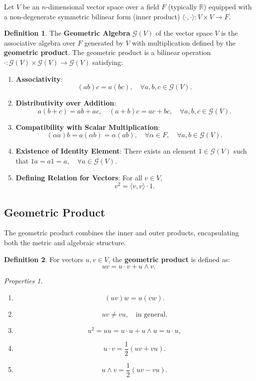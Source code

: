 \documentclass[a4paper,14pt]{article}
\theoremstyle{plain} %
\theoremstyle{definition} %
\theoremstyle{remark} %
\theoremstyle{definition}
\newtheorem{definition}{Definition}[section]
\theoremstyle{remark}
\newtheorem*{properties}{Properties}
\theoremstyle{remark}
\begin{document}
	Let \( V \) be an \( n \)-dimensional vector space over a field \( F \) (typically \( \mathbb{R} \)) equipped with a non-degenerate symmetric bilinear form (inner product) \( \langle \cdot , \cdot \rangle : V \times V \rightarrow F \).
	
	\begin{definition}
		The \textbf{Geometric Algebra} \( \mathcal{G}(V) \) of the vector space \( V \) is the associative algebra over \( F \) generated by \( V \) with multiplication defined by the \textbf{geometric product}. The geometric product is a bilinear operation \( \cdot : \mathcal{G}(V) \times \mathcal{G}(V) \rightarrow \mathcal{G}(V) \) satisfying:
		
		\begin{enumerate}
			\item \textbf{Associativity}:
			\[
			(a b) c = a (b c), \quad \forall a, b, c \in \mathcal{G}(V).
			\]
			\item \textbf{Distributivity over Addition}:
			\[
			a (b + c) = a b + a c, \quad (a + b) c = a c + b c, \quad \forall a, b, c \in \mathcal{G}(V).
			\]
			\item \textbf{Compatibility with Scalar Multiplication}:
			\[
			(\alpha a) b = a (\alpha b) = \alpha (a b), \quad \forall \alpha \in F, \quad \forall a, b \in \mathcal{G}(V).
			\]
			\item \textbf{Existence of Identity Element}:
			There exists an element \( 1 \in \mathcal{G}(V) \) such that \( 1 a = a 1 = a, \quad \forall a \in \mathcal{G}(V) \).
			\item \textbf{Defining Relation for Vectors}:
			For all \( v \in V \),
			\[
			v^2 = \langle v, v \rangle \cdot 1.
			\]
		\end{enumerate}
	\end{definition}
	
	\subsection{Geometric Product}
	
	The geometric product combines the inner and outer products, encapsulating both the metric and algebraic structure.
	
	\begin{definition}
		For vectors \( u, v \in V \), the \textbf{geometric product} is defined as:
		\[
		u v = u \cdot v + u \wedge v.
		\]
	\end{definition}
	
	\begin{properties}
		\begin{enumerate}
			\item
			\[
			(u v) w = u (v w).
			\]
			\item
			\[
			u v \neq v u, \quad \text{in general}.
			\]
			\item
			\[
			u^2 = u u = u \cdot u + u \wedge u = u \cdot u,
			\]
			\item
			\[
			u \cdot v = \frac{1}{2} (u v + v u).
			\]
			\item \[
			u \wedge v = \frac{1}{2} (u v - v u).
			\]
		\end{enumerate}
	\end{properties}
	
\end{document}
